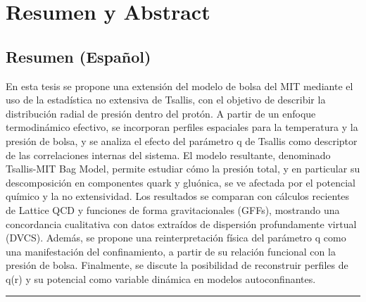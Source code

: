 \documentclass[12pt, a4paper, twoside, openright, final]{book}
\begin{document}


\newpage
\thispagestyle{empty}

\frontmatter


\chapter*{Resumen y Abstract}
\label{ch:abstract}

\section*{Resumen (Español)}
En esta tesis se propone una extensión del modelo de bolsa del MIT mediante el uso de la estadística no extensiva de Tsallis, con el objetivo de describir la distribución radial de presión dentro del protón. A partir de un enfoque termodinámico efectivo, se incorporan perfiles espaciales para la temperatura y la presión de bolsa, y se analiza el efecto del parámetro q de Tsallis como descriptor de las correlaciones internas del sistema. El modelo resultante, denominado Tsallis-MIT Bag Model, permite estudiar cómo la presión total, y en particular su descomposición en componentes quark y gluónica, se ve afectada por el potencial químico y la no extensividad. Los resultados se comparan con cálculos recientes de Lattice QCD y funciones de forma gravitacionales (GFFs), mostrando una concordancia cualitativa con datos extraídos de dispersión profundamente virtual (DVCS). Además, se propone una reinterpretación física del parámetro q como una manifestación del confinamiento, a partir de su relación funcional con la presión de bolsa. Finalmente, se discute la posibilidad de reconstruir perfiles de q(r) y su potencial como variable dinámica en modelos autoconfinantes.

\vspace{1em}
\hrule
\vspace{1em}
\end{document}

